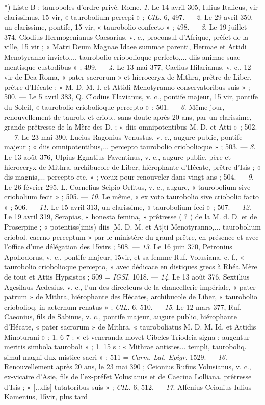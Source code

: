 \documentclass[a4paper, 11pt, oneside, polutonikogreek, french]{article}
\begin{document}
*) Liste B : tauroboles d'ordre privé.  
Rome. \emph{1}. Le 14 avril 305, Iulius Italicus, vir clarissimus, 15 vir, « taurobolium percepi » ; \emph{CIL.} 6, 497. --- \emph{2}. Le 29 avril 350, un clarissime, pontife, 15 vir, « taurobolio confecto » ; 498. --- \emph{3}. Le 19 juillet 374, Clodius Hermogenianus Caesarius, v. c., proconsul d'Afrique, préfet de la ville, 15 vir ; « Matri Deum Magnae Idaee summae parenti, Hermae et Attidi Menotyranno invicto,... taurobolio criobolioque perfecto,... diis animae suae mentisque custodibus » ; 499. --- \emph{4}. Le 13 mai 377, Caelius Hilarianus, v. c., 12 vir de Dea Roma, « pater sacrorum » et hieroceryx de Mithra, prêtre de Liber, prêtre d'Hécate ; « M. D. M. I. et Attidi Menotyranno conservatoribus suis » ; 500. --- Le 5 avril 383, Q. Clodius Flavianus, v. c., pontife majeur, 15 vir, pontife du Soleil, « taurobolio criobolioque percepto » ; 501. --- \emph{6}. Même jour, renouvellement de taurob. et criob., sans doute après 20 ans, par un clarissime, grande prêtresse de la Mère des D. ; « diis omnipotentibus M. D. et Atti » ; 502. --- \emph{7}. Le 23 mai 390, Lucius Ragonius Venustus, v. c., augure public, pontife majeur ; « diis omnipotentibus,... percepto taurobolio criobolioque » ; 503. --- \emph{8}. Le 13 août 376, Ulpius Egnatius Faventinus, v. c., augure public, père et hieroceryx de Mithra, archibucole de Liber, hiérophante d'Hécate, prêtre d'Isis ; « dis magnis,... percepto etc. » ; vœux pour renouveler dans vingt ans ; 504. --- \emph{9}. Le 26 février 295, L. Cornelius Scipio Orfitus, v. c., augure, « taurobolium sive criobolium fecit » ; 505. --- \emph{10}. Le même, « ex voto taurobolio sive criobolio facto » ; 506. --- \emph{11}. Le 15 avril 313, un clarissime, « taurobolium feci » ; 507. --- \emph{12}. Le 19 avril 319, Serapias, « honesta femina, » prêtresse ( ? ) de la M. d. D. et de Proserpine ; « potentiss(imis) diis [M. D. M. et At]ti Menotyranno,... taurobolium criobol. caerno perceptum » par le ministère du grand-prêtre, en présence et avec l'office d'une délégation des 15virs ; 508. --- \emph{13}. Le 16 juin 370, Petronius Apollodorus, v. c., pontife majeur, 15vir, et sa femme Ruf. Volusiana, c. f., « taurobolio criobolioque percepto, » avec dédicace en distiques grecs à Rhéa Mère de tout et Attis Hypsistos ; 509 = \emph{IGSI.} 1018. --- \emph{14}. Le 13 août 376, Sextilius Agesilaus Aedesius, v. c., l'un des directeurs de la chancellerie impériale, « pater patrum » de Mithra, hiérophante des Hécates, archibucole de Liber, « taurobolio criobolioq. in aeternum renatus » ; \emph{CIL.} 6, 510. --- \emph{15}. Le 12 mars 377, Ruf. Caeonius, fils de Sabinus, v. c., pontife majeur, augure public, hiérophante d'Hécate, « pater sacrorum » de Mithra, « tauroboliatus M. D. M. Id. et Attidis Minoturani » ; 1. 6-7 : « et veneranda movet Cibeles Triodeia signa ; augentur meritis simbola tauroboli » ; 1. 15 s : « Mithrae antistes... templi, tauroboliq. simul magni dux mistice sacri » ; 511 = \emph{Carm. Lat. Epigr.} 1529. --- \emph{16}. Renouvellement après 20 ans, le 23 mai 390 ; Ceionius Rufius Volusianus, v. c., ex-vicaire d'Asie, fils de l'ex-préfet Volusianus et de Caecina Lolliana, prêtresse d'Isis ; « [...dis] tutatoribus suis » ; \emph{CIL.} 6, 512. --- \emph{17}. Alfenius Ceionius Iulius Kamenius, 15vir, plus tard 
\end{document}
